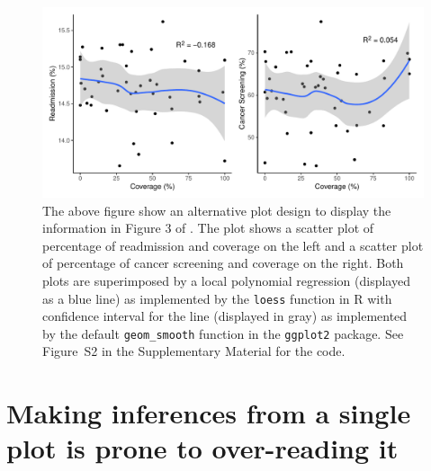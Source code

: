 \documentclass[ijds,nonblindrev]{informs-ijds}
\begin{document}
\begin{figure}[h!]
    \centering
    \includegraphics[width = \textwidth]{fig3-alt-1.pdf}
    \caption{The above figure show an alternative plot design to display the information in Figure 3 of \citet{basole2021}. The plot shows a scatter plot of percentage of readmission and coverage on the left and a scatter plot of percentage of cancer screening and coverage on the right. Both plots are superimposed by a local polynomial regression (displayed as a blue line) as implemented by the \texttt{loess} function in R with confidence interval for the line (displayed in gray) as implemented by the default \texttt{geom\_smooth} function in the \texttt{ggplot2} package. See Figure~S2 in the Supplementary Material for the code.}
    \label{fig:fig3-alt-with-line}
\end{figure}


\section{Making inferences from a single plot is prone to over-reading it}\label{sec:visinf}
\end{document}
